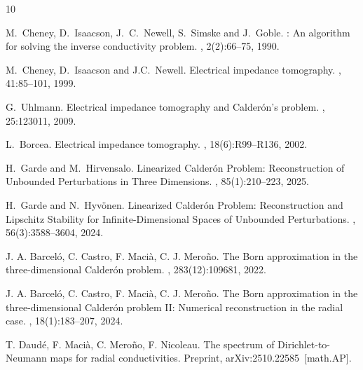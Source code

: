 \documentclass[reqno]{amsart}
\numberwithin{equation}{section}
\numberwithin{figure}{section}
\numberwithin{table}{section}
\theoremstyle{plain}
\theoremstyle{definition}
\theoremstyle{remark}
\begin{document}

	\begin{thebibliography}{10}


    M.~Cheney, D.~Isaacson, J.~C.~Newell, S.~Simske and J.~Goble.
    : An algorithm for solving the inverse conductivity problem.
    , 2(2):66--75, 1990.


    M.~Cheney,  D.~Isaacson and J.C.~Newell.
    \newblock Electrical impedance tomography.
    , 41:85--101, 1999.


    G.~Uhlmann.
    \newblock Electrical impedance tomography and {C}alder\'on's problem.
    , 25:123011, 2009.


    L.~Borcea.
    \newblock Electrical impedance tomography.
    , 18(6):R99--R136, 2002.


    H.~Garde and M.~Hirvensalo.
    \newblock Linearized {C}alder{\'o}n Problem: {R}econstruction of Unbounded Perturbations in Three Dimensions.
    , 85(1):210--223, 2025.


    H.~Garde and N.~Hyv\"onen.
    \newblock Linearized {C}alder{\'o}n Problem: {R}econstruction and {L}ipschitz Stability for Infinite-Dimensional Spaces of Unbounded Perturbations.
    , 56(3):3588--3604, 2024.


    J. A. Barcel{\'o}, C. Castro, F. Maci{\`a}, C. J. Mero{\~n}o.
    \newblock The {B}orn approximation in the three-dimensional {C}alder{\'o}n problem.
    , 283(12):109681, 2022.


    J. A. Barcel{\'o}, C. Castro, F. Maci{\`a}, C. J. Mero{\~n}o.
    \newblock The {B}orn approximation in the three-dimensional {C}alder{\'o}n problem {II}: {N}umerical reconstruction in the radial case.
    , 18(1):183--207, 2024.


    T. Daud{\'e}, F. Maci{\`a}, C. Mero{\~n}o, F. Nicoleau.
    \newblock The spectrum of {D}irichlet-to-{N}eumann maps for radial conductivities.
    \newblock Preprint, arXiv:2510.22585~[math.AP].



\end{thebibliography}
\end{document}
